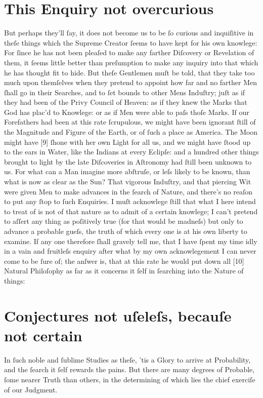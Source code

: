 \documentclass[letterpaper]{book}
\begin{document}
\section{This Enquiry not overcurious}

But perhaps they'll ſay, it does not become us to be ſo curious and
inquiſitive in theſe things which the Supreme Creator ſeems to have kept for
his own knowlege: For ſince he has not been pleaſed to make any farther
Diſcovery or Revelation of them, it ſeems little better than preſumption to
make any inquiry into that which he has thought fit to hide. But theſe
Gentlemen muſt be told, that they take too much upon themſelves when they
pretend to appoint how far and no farther Men ſhall go in their Searches,
and to ſet bounds to other Mens Induſtry; juſt as if they had been of the
Privy Council of Heaven: as if they knew the Marks that God has plac'd to
Knowlege: or as if Men were able to paſs thoſe Marks. If our Forefathers had
been at this rate ſcrupulous, we might have been ignorant ſtill of the
Magnitude and Figure of the Earth, or of ſuch a place as America. The Moon
might have [9] ſhone with her own Light for all us, and we might have ſtood
up to the ears in Water, like the Indians at every Eclipſe: and a hundred
other things brought to light by the late Diſcoveries in Aſtronomy had ſtill
been unknown to us. For what can a Man imagine more abſtruſe, or leſs likely
to be known, than what is now as clear as the Sun? That vigorous Induſtry,
and that piercing Wit were given Men to make advances in the ſearch of
Nature, and there's no reaſon to put any ſtop to ſuch Enquiries. I muſt
acknowlege ſtill that what I here intend to treat of is not of that nature
as to admit of a certain knowlege; I can't pretend to aſſert any thing as
poſitively true (for that would be madneſs) but only to advance a probable
gueſs, the truth of which every one is at his own liberty to examine. If any
one therefore ſhall gravely tell me, that I have ſpent my time idly in a
vain and fruitleſs enquiry after what by my own acknowlegement I can never
come to be ſure of; the anſwer is, that at this rate he would put down all
[10] Natural Philoſophy as far as it concerns it ſelf in ſearching into the
Nature of things:


\section{Conjectures not uſeleſs, becauſe not certain}

In ſuch noble and ſublime Studies as theſe, 'tis a Glory to arrive at
Probability, and the ſearch it ſelf rewards the pains. But there are many
degrees of Probable, ſome nearer Truth than others, in the determining of
which lies the chief exerciſe of our Judgment.
\end{document}
